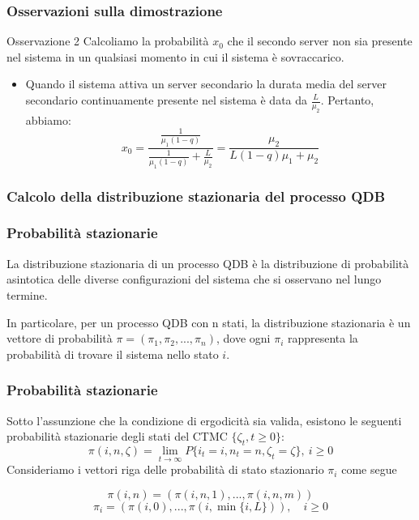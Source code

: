 \documentclass{beamer}
\begin{document}
\begin{frame}
    \frametitle{Osservazioni sulla dimostrazione}
    \begin{block}{Osservazione 2}
        Calcoliamo la probabilità $x_0$ che il secondo server non sia presente nel sistema in un qualsiasi momento in cui il sistema è sovraccarico.

        \begin{itemize}
            \item  Quando il sistema attiva un server secondario la durata media del server secondario continuamente presente nel sistema è data da $\frac{L}{\mu_2}$. Pertanto, abbiamo:
            \begin{equation*}
                x_0  = \frac{\frac{1}{\mu_1(1-q)}}{\frac{1}{\mu_1(1-q)} + \frac{L}{\mu_2}} = \frac{\mu_2}{L(1-q)\mu_1 + \mu_2}
            \end{equation*}
        \end{itemize}
    \end{block}
\end{frame}

\subsubsection{Calcolo della distribuzione stazionaria del processo QDB}

\begin{frame}
    \frametitle{Probabilità stazionarie}
    \begin{block}{}
        La distribuzione stazionaria di un processo QDB è la distribuzione di probabilità asintotica delle diverse configurazioni del sistema che si osservano nel lungo termine.
    \end{block}
    In particolare, per un processo QDB con n stati, la distribuzione stazionaria è un vettore di probabilità $\pi = (\pi_1, \pi_2, ..., \pi_n)$, dove ogni $\pi_i$ rappresenta la probabilità di trovare il sistema nello stato $i$.
\end{frame}


\begin{frame}
    \frametitle{Probabilità stazionarie}
    Sotto l'assunzione che la condizione di ergodicità sia valida, esistono le seguenti probabilità stazionarie degli stati del CTMC $\{\zeta_t, t \geq 0\}$:
    $$\pi(i,n,\zeta) = \lim_{t \to \infty} P\{i_t = i, n_t = n, \zeta_t = \zeta\}, ~ i \geq 0$$
    Consideriamo i vettori riga delle probabilità di stato stazionario $\pi_i$ come segue
    \begin{block}{}
        $$\pi(i,n) = (\pi(i,n,1), ..., \pi(i,n,m))$$
        $$\pi_i = (\pi(i,0), ..., \pi(i, \min \{i,L\})), \quad i \geq 0$$
    \end{block}
\end{frame}
\end{document}
